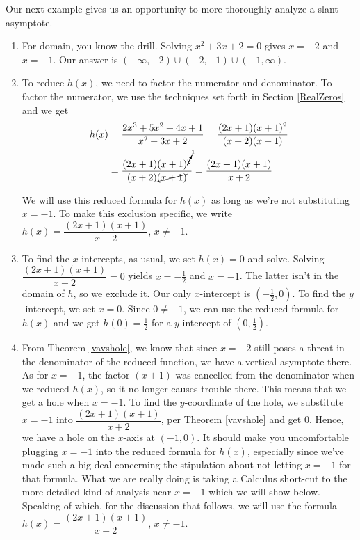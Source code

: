 \medskip

Our next example gives us an opportunity to more thoroughly analyze a slant asymptote.

\medskip

{
\begin{enumerate}

\item  For domain, you know the drill.  Solving $x^2+3x+2 = 0$ gives $x = -2$ and $x=-1$.  Our answer is $(-\infty, -2) \cup (-2, -1) \cup (-1, \infty)$.

\item  To reduce $h(x)$, we need to factor the numerator and denominator.  To factor the numerator, we use the techniques set forth in Section \ref{RealZeros} and we get  
\begin{align*}
h(x) & =  \dfrac{2x^3+5x^2+4x+1}{x^2+3x+2} = \dfrac{(2x+1)(x+1)^2}{(x+2)(x+1)}\\
& = \dfrac{ (2x+1) (x+1)^{\cancelto{1}{2}}  }{(x+2)\cancel{(x+1)}} = \dfrac{(2x+1)(x+1)}{x+2}
\end{align*}

We will use this reduced formula for $h(x)$ as long as we're not substituting $x=-1$.  To make this exclusion specific, we write $h(x) = \dfrac{(2x+1)(x+1)}{x+2}$, $x \neq -1$.

\item  To find the $x$-intercepts, as usual, we set $h(x) = 0$ and solve.  Solving $\dfrac{(2x+1)(x+1)}{x+2}=0$ yields $x=-\frac{1}{2}$ and $x=-1$.  The latter isn't in the domain of $h$, so we exclude it.  Our only $x$-intercept is $\left(-\frac{1}{2}, 0\right)$.  To find the $y$-intercept, we set $x=0$.  Since $0 \neq -1$, we can use the reduced formula for $h(x)$ and we get $h(0) = \frac{1}{2}$ for a $y$-intercept of $\left(0,\frac{1}{2}\right)$.

\item  From Theorem \ref{vavshole}, we know that since $x=-2$ still poses a threat in the denominator of the reduced function, we have a vertical asymptote there.  As for $x=-1$, the factor $(x+1)$ was cancelled from the denominator when we reduced $h(x)$, so it no longer causes trouble there.  This means that we get a hole when $x=-1$.  To find the $y$-coordinate of the hole, we substitute $x=-1$ into $\dfrac{(2x+1)(x+1)}{x+2}$, per Theorem \ref{vavshole} and get $0$.  Hence, we have a hole on the $x$-axis at $(-1,0)$.  It should make you uncomfortable plugging $x=-1$ into the reduced formula for $h(x)$, especially since we've made such a big deal concerning the stipulation about not letting $x=-1$ for that formula.  What we are really doing is taking a Calculus short-cut to the more detailed kind of analysis near $x=-1$ which we will show below.  Speaking of which, for the discussion that follows,  we will use the formula $h(x) = \dfrac{(2x+1)(x+1)}{x+2}$, $x \neq -1$.


\end{enumerate}}
